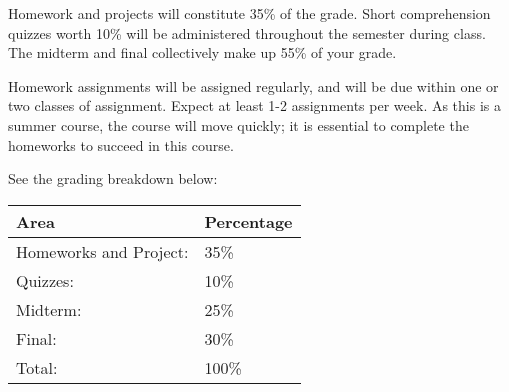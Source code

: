Homework and projects will constitute 35\% of the grade. Short comprehension quizzes worth 10\%
will be administered throughout the semester during class. The midterm and final collectively make up 55\% of your grade.

Homework assignments will be assigned regularly, and will be due within one or two classes of assignment. Expect at least 1-2 assignments per week.
As this is a summer course, the course will move quickly; it is essential to complete the homeworks to succeed in this course.

See the grading breakdown below:
\par\vspace{1cm}
\begin{tabular}{ @{}ll@{} }
    \toprule
        Area & Percentage \\
    \midrule
        Homeworks and Project: & 35\% \\
        Quizzes: & 10\% \\
        Midterm: & 25\% \\
        Final: & 30\% \\
        Total: & 100\% \\
    \bottomrule
\end{tabular}